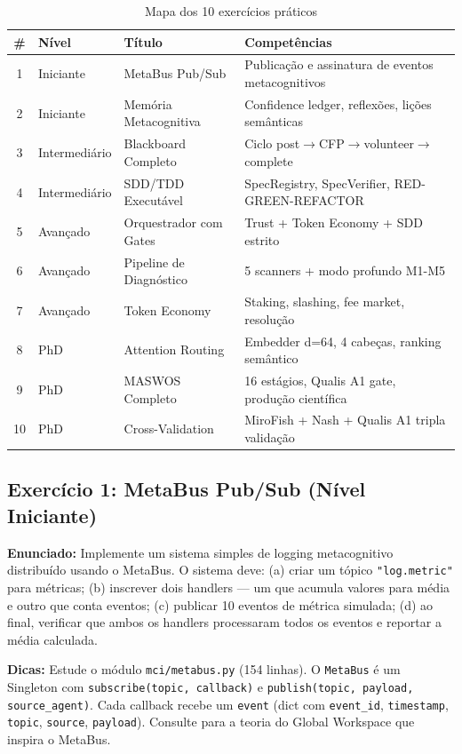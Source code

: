 \begin{table}[H]
\centering
\caption{Mapa dos 10 exercícios práticos}
\label{tab:exercicios}
\begin{tabular}{@{}cllp{5cm}@{}}
\toprule
\textbf{\#} & \textbf{Nível} & \textbf{Título} & \textbf{Competências} \\
\midrule
1 & Iniciante & MetaBus Pub/Sub & Publicação e assinatura de eventos metacognitivos \\
2 & Iniciante & Memória Metacognitiva & Confidence ledger, reflexões, lições semânticas \\
3 & Intermediário & Blackboard Completo & Ciclo post$\to$CFP$\to$volunteer$\to$complete \\
4 & Intermediário & SDD/TDD Executável & SpecRegistry, SpecVerifier, RED-GREEN-REFACTOR \\
5 & Avançado & Orquestrador com Gates & Trust + Token Economy + SDD estrito \\
6 & Avançado & Pipeline de Diagnóstico & 5 scanners + modo profundo M1-M5 \\
7 & Avançado & Token Economy & Staking, slashing, fee market, resolução \\
8 & PhD & Attention Routing & Embedder d=64, 4 cabeças, ranking semântico \\
9 & PhD & MASWOS Completo & 16 estágios, Qualis A1 gate, produção científica \\
10 & PhD & Cross-Validation & MiroFish + Nash + Qualis A1 tripla validação \\
\bottomrule
\end{tabular}
\end{table}

\subsection{Exercício 1: MetaBus Pub/Sub (Nível Iniciante)}
\label{sec:ex1}

\textbf{Enunciado:} Implemente um sistema simples de logging metacognitivo distribuído usando o MetaBus. O sistema deve: (a) criar um tópico \texttt{"log.metric"} para métricas; (b) inscrever dois handlers — um que acumula valores para média e outro que conta eventos; (c) publicar 10 eventos de métrica simulada; (d) ao final, verificar que ambos os handlers processaram todos os eventos e reportar a média calculada.

\textbf{Dicas:} Estude o módulo \texttt{mci/metabus.py} (154 linhas). O \texttt{MetaBus} é um Singleton com \texttt{subscribe(topic, callback)} e \texttt{publish(topic, payload, source\_agent)}. Cada callback recebe um \texttt{event} (dict com \texttt{event\_id}, \texttt{timestamp}, \texttt{topic}, \texttt{source}, \texttt{payload}). Consulte \citet{baars1997global} para a teoria do Global Workspace que inspira o MetaBus.

